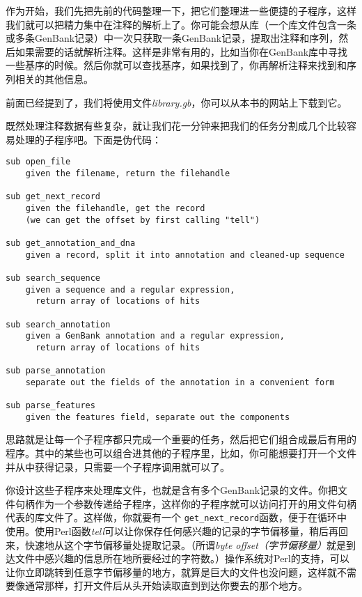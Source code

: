 作为开始，我们先把先前的代码整理一下，把它们整理进一些便捷的子程序，这样我们就可以把精力集中在注释的解析上了。你可能会想从库（一个库文件包含一条或多条GenBank记录）中一次只获取一条GenBank记录，提取出注释和序列，然后如果需要的话就解析注释。这样是非常有用的，比如当你在GenBank库中寻找一些基序的时候。然后你就可以查找基序，如果找到了，你再解析注释来找到和序列相关的其他信息。

前面已经提到了，我们将使用文件\textit{library.gb}，你可以从本书的网站上下载到它。

既然处理注释数据有些复杂，就让我们花一分钟来把我们的任务分割成几个比较容易处理的子程序吧。下面是伪代码：

\begin{lstlisting}
sub open_file
    given the filename, return the filehandle

sub get_next_record
    given the filehandle, get the record
    (we can get the offset by first calling "tell")

sub get_annotation_and_dna
    given a record, split it into annotation and cleaned-up sequence

sub search_sequence
    given a sequence and a regular expression,
      return array of locations of hits

sub search_annotation
    given a GenBank annotation and a regular expression,
      return array of locations of hits

sub parse_annotation
    separate out the fields of the annotation in a convenient form

sub parse_features
    given the features field, separate out the components
\end{lstlisting}

思路就是让每一个子程序都只完成一个重要的任务，然后把它们组合成最后有用的程序。其中的某些也可以组合进其他的子程序里，比如，你可能想要打开一个文件并从中获得记录，只需要一个子程序调用就可以了。

你设计这些子程序来处理库文件，也就是含有多个GenBank记录的文件。你把文件句柄作为一个参数传递给子程序，这样你的子程序就可以访问打开的用文件句柄代表的库文件了。这样做，你就要有一个 \verb|get_next_record|函数，便于在循环中使用。使用Perl函数\textit{tell}可以让你保存任何感兴趣的记录的字节偏移量，稍后再回来，快速地从这个字节偏移量处提取记录。（所谓\textit{byte offset（字节偏移量）}就是到达文件中感兴趣的信息所在地所要经过的字符数。）操作系统对Perl的支持，可以让你立即跳转到任意字节偏移量的地方，就算是巨大的文件也没问题，这样就不需要像通常那样，打开文件后从头开始读取直到到达你要去的那个地方。

